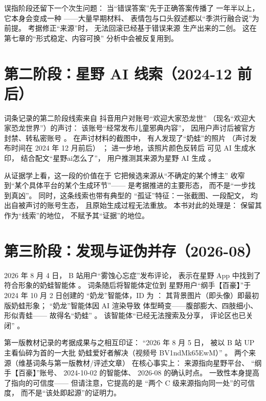 \begin{nlcritique}[批判性反思]
  误指阶段还留下一个次生问题：
  当“错误答案”先于正确答案传播了
  一年半以上，它本身会变成一种
  ——大量早期材料、
  表情包与口头叙述都以“季洪行融合说”为前提。
  考据修正“来源”时，
  无法回滚已经基于错误来源
  生产出来的二创。
  这在第七章的“形式稳定、内容可换”
  分析中会被反复用到。
\end{nlcritique}

\section{第二阶段：星野 AI 线索（2024-12 前后）}\label{sec:04:clue}

词条记录的第二阶段线索来自
抖音用户对账号“欢迎大家恐龙世”
（现名“欢迎大家恐龙世界”）的声讨：
该账号“经常发布儿童邪典内容”，
因用户声讨后被官方封禁、转私密账号
\cite{lostmedia2026naiwa}。
在声讨材料的截图中，
有人发现了“奶蛙”的照片
（声讨发布时间在 2024 年 12 月前后）
\cite{lostmedia2026naiwa}；
进一步地，该照片颜色反转后
可见 AI 生成水印，
结合配文“星野ai怎么了”，
用户推测其来源为星野 AI 生成
\cite{lostmedia2026naiwa}。

从证据学上看，这一段的价值在于
它把候选来源从“不确定的某个博主”
收窄到“某个具体平台的某个生成环节”——
是考据推进的主要形态，
而不是“一步找到真凶”。
同时，这条线索也带有典型的
“孤证”特征：一张截图、一段配文，
均出自被声讨的账号生态，
且原始生成过程无法重放。
本书对此的处理是：
保留其作为“线索”的地位，
不赋予其“证据”的地位。

\section{第三阶段：发现与证伪并存（2026-08）}\label{sec:04:discovery}

2026 年 8 月 4 日，
B 站用户“雾蚀心忘症”发布评论，
表示在星野 App 中找到了
符合形象的奶蛙智能体
\cite{lostmedia2026naiwa}。
词条随后将智能体定位到
星野用户“纲手【百豪】”于
2024 年 10 月 2 日创建的
“奶龙”智能体，ID 为 ：
其背景图片（即头像）即最初版奶蛙形象；
“奶龙”智能体因 AI 渲染导致
体型畸变——腹部膨大、四肢细小、形似青蛙——
故得名“奶蛙”
\cite{lostmedia2026naiwa}。
该智能体“已经无法搜索及分享，
评论区也已关闭”
\cite{lostmedia2026naiwa}。

第一版教材记录的考据成果与之相互印证：
“2026 年 8 月 5 日，
被以 B 站 UP 主看仙碎为首的一大批
奶蛙爱好者解决（视频号 BV1ndMk65EwM）”
\cite{shoutanji2026naiwa}。
两个来源（维基词条与第一版教材/评述文章）
在核心事实上：
来源指向星野平台、
“纲手【百豪】”账号、
2024-10-02 的智能体、
2026-08 的确认时点。
一致性本身提高了指向的可信度——
但请注意，它提高的是
“两个 C 级来源指向同一处”的可信度，
而不是“该处即起源”的证明力。

